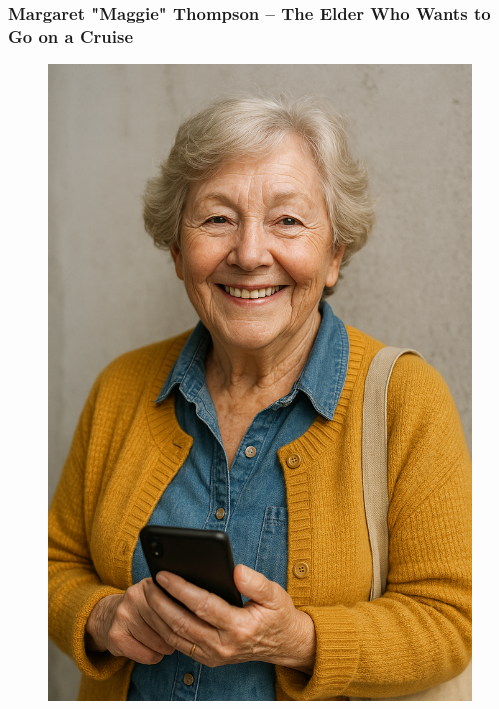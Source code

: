 \documentclass[a4paper,12pt]{article}
\begin{document}
\subsubsection{Margaret "Maggie" Thompson – The Elder Who Wants to Go on a Cruise}
\begin{figure}[H]
    \centering
    \includegraphics[scale=0.1]{margaret.png}
\end{figure}
\end{document}
